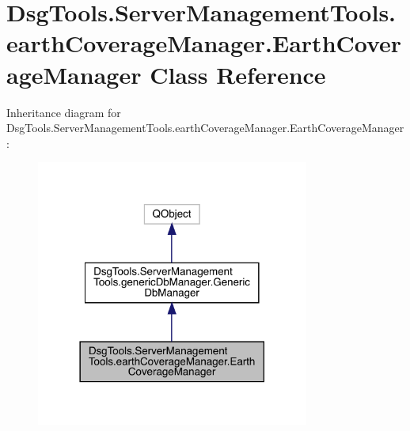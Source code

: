 \hypertarget{class_dsg_tools_1_1_server_management_tools_1_1earth_coverage_manager_1_1_earth_coverage_manager}{}\section{Dsg\+Tools.\+Server\+Management\+Tools.\+earth\+Coverage\+Manager.\+Earth\+Coverage\+Manager Class Reference}
\label{class_dsg_tools_1_1_server_management_tools_1_1earth_coverage_manager_1_1_earth_coverage_manager}


Inheritance diagram for Dsg\+Tools.\+Server\+Management\+Tools.\+earth\+Coverage\+Manager.\+Earth\+Coverage\+Manager\+:
\nopagebreak
\begin{figure}[H]
\begin{center}
\leavevmode
\includegraphics[width=254pt]{class_dsg_tools_1_1_server_management_tools_1_1earth_coverage_manager_1_1_earth_coverage_manager__inherit__graph}
\end{center}
\end{figure}



